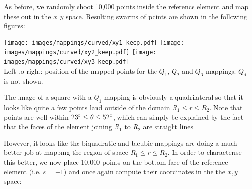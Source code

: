 As before, we randomly shoot 10,000 points inside the reference element 
and map these out in the $x,y$ space. Resulting swarms of points are shown 
in the following figures:

\begin{center}
\texttt{[image: images/mappings/curved/xy1\_keep.pdf]}
\texttt{[image: images/mappings/curved/xy2\_keep.pdf]}
\texttt{[image: images/mappings/curved/xy3\_keep.pdf]}\\
{\captionfont Left to right: position of the mapped points for the $Q_1$, $Q_2$ and $Q_3$ mappings.
$Q_4$ is not shown.}
\end{center}

The image of a square with a $Q_1$ mapping is obviously a quadrilateral
so that it looks like quite a few points land outside of the domain $R_1\leq r\leq R_2$.
Note that points are well within $23\degree \leq \theta \leq 52\degree$, which can 
simply be explained by the fact that the faces of the element joining $R_1$
to $R_2$ are straight lines.

However, it looks like the biquadratic and bicubic mappings are doing a much better 
job at mapping the region of space $R_1\leq r\leq R_2$. In order to characterise 
this better, we now place 10,000 points on the bottom face of 
the reference element (i.e. $s=-1$)
and once again compute their coordinates in the the $x,y$ space:

